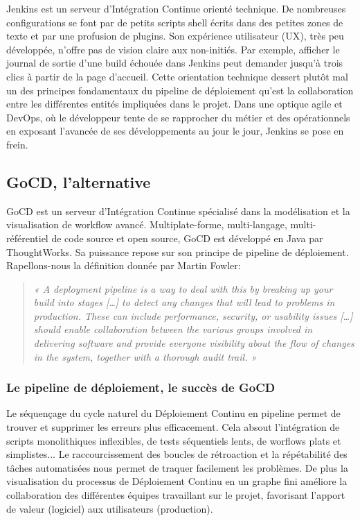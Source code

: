     Jenkins est un serveur d’Intégration Continue orienté technique. De nombreuses configurations se font par de petits scripts shell écrits dans des petites zones de texte et par une profusion de plugins. Son expérience utilisateur (\gls{UX}), très peu développée, n’offre pas de vision claire aux non-initiés. Par exemple, afficher le journal de sortie d’une build échouée dans Jenkins peut demander jusqu’à trois clics à partir de la page d’accueil. Cette orientation technique dessert plutôt mal un des principes fondamentaux du pipeline de déploiement qu’est la collaboration entre les différentes entités impliquées dans le projet. Dans une optique agile et DevOps, où le développeur tente de se rapprocher du métier et des opérationnels en exposant l’avancée de ses développements au jour le jour, Jenkins se pose en frein.

    \subsection{GoCD, l'alternative}
    GoCD est un serveur d'Intégration Continue spécialisé dans la modélisation et la visualisation de workflow avancé. Multiplate-forme, multi-langage, multi-référentiel de code source et open source, GoCD est développé en Java par ThoughtWorks. Sa puissance repose sur son principe de pipeline de déploiement. Rapellons-nous la définition donnée par Martin Fowler:\\

    \begin{quotation}
      \emph{« A deployment pipeline is a way to deal with this by breaking up your build into stages […] to detect any changes that will lead to problems in production. These can include performance, security, or usability issues […] should enable collaboration between the various groups involved in delivering software and provide everyone visibility about the flow of changes in the system, together with a thorough audit trail. »}
    \end{quotation}

    \subsubsection{Le pipeline de déploiement, le succès de GoCD}
    Le séquençage du cycle naturel du Déploiement Continu en pipeline permet de trouver et supprimer les erreurs plus efficacement. Cela absout l'intégration de scripts monolithiques inflexibles, de tests séquentiels lents, de worflows plats et simplistes... Le raccourcissement des boucles de rétroaction et la répétabilité des tâches automatisées nous permet de traquer facilement les problèmes. De plus la visualisation du processus de Déploiement Continu en un graphe fini améliore la collaboration des différentes équipes travaillant sur le projet, favorisant l'apport de valeur (logiciel) aux utilisateurs (production).

